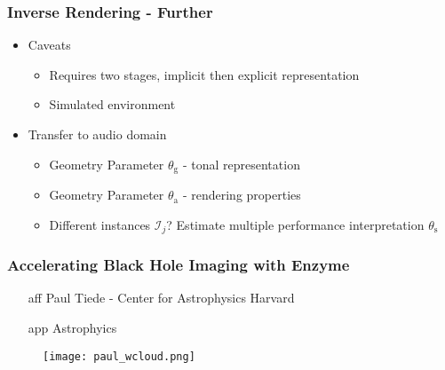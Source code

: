 \documentclass[11pt]{beamer}
\begin{document}
\begin{frame}
	\frametitle{Inverse Rendering - Further}

	\begin{itemize}
		\item Caveats
		\begin{itemize}
			\item Requires two stages, implicit then explicit representation
			\item Simulated environment
		\end{itemize}
		\pause
		\item Transfer to audio domain
			\begin{itemize}
				\item Geometry Parameter \( \theta_\text{g} \) - tonal representation
				\item Geometry Parameter \( \theta_\text{a} \) - rendering properties
				\item Different instances \( \mathcal{I}_j \)? Estimate multiple performance interpretation \( \theta_\text{s} \)
			\end{itemize}

			\begin{figure}
				

			\end{figure}
	\end{itemize}
\end{frame}

\begin{frame}
	\frametitle{Accelerating Black Hole Imaging with Enzyme}

	\begin{minipage}{0.47\linewidth}
		\begin{itemize}
			\item[aff] Paul Tiede - Center for Astrophysics Harvard
			\item[app] Astrophyics
		\end{itemize}
	\end{minipage}
	\hfill
	\begin{minipage}{0.50\linewidth}
		\begin{figure}
			\texttt{[image: paul\_wcloud.png]}
		\end{figure}
	\end{minipage}
\end{frame}
\end{document}
